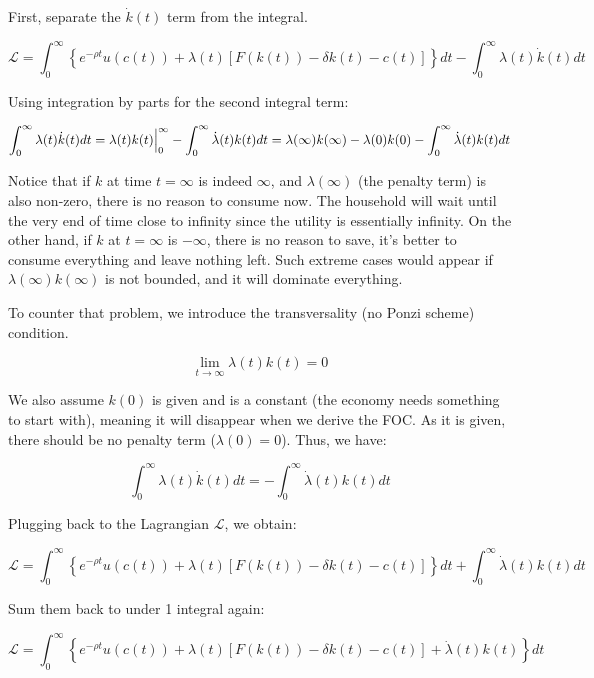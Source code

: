 \documentclass[11pt,a4paper]{book}
\theoremstyle{definition}\newtheorem{definition}{Definition}
\theoremstyle{definition}\newtheorem{fact}{Fact}
\theoremstyle{definition}\newtheorem{remark}{Remark}
\theoremstyle{definition}\newtheorem{ex}{Ex.}
\theoremstyle{definition}\newtheorem{project}{Project}
\theoremstyle{definition}\newtheorem{problem}{Problem}
\theoremstyle{definition}\newtheorem{example}{Example}
\numberwithin{theorem}{section}
\numberwithin{corollary}{chapter}
\numberwithin{assumption}{chapter}
\numberwithin{definition}{chapter}
\numberwithin{prop}{chapter}
\numberwithin{notation}{chapter}
\numberwithin{problem}{chapter}
\numberwithin{example}{chapter}
\numberwithin{fact}{chapter}
\numberwithin{ex}{chapter}
\begin{document}
First, separate the $\dot{k}(t)$ term from the integral.

$$
    \mathcal{L} = \int_{0}^{\infty} \left\{ e^{-\rho t} u(c(t)) + \lambda(t) \left[ F( k(t)) - \delta k(t) - c(t)  \right] \right\} dt - \int_{0}^{\infty} \lambda(t)\dot{k}(t)dt
$$

Using integration by parts  for the second integral term:

$$
     \int_{0}^{\infty} \lambda(t) \dot{k}(t) dt                                               \\
     = \lambda(t) k(t) \Big|_0^\infty - \int_{0}^{\infty} \dot{\lambda}(t)k(t)dt              \\
     = \lambda(\infty) k(\infty) - \lambda(0) k(0) - \int_{0}^{\infty} \dot{\lambda}(t)k(t)dt 
$$

Notice that if $k$ at time $t=\infty$ is indeed $\infty$, and $\lambda(\infty)$ (the penalty term) is also non-zero, there is no reason to consume now. The household will wait until the very end of time close to infinity since the utility is essentially infinity. On the other hand, if $k$ at $t=\infty$ is $-\infty$, there is no reason to save, it's better to consume everything and leave nothing left. Such extreme cases would appear if $\lambda(\infty)k(\infty)$ is not bounded, and it will dominate everything.

To counter that problem, we introduce the transversality (no Ponzi scheme) condition.

$$
    \lim_{t\to\infty} \lambda(t)k(t) = 0
$$

We also assume $k(0)$ is given and is a constant (the economy needs something to start with), meaning it will disappear when we derive the FOC. As it is given, there should be no penalty term ($\lambda(0) = 0$). Thus, we have:

$$
    \int_{0}^{\infty} \lambda(t)\dot{k}(t) dt = - \int_{0}^{\infty} \dot{\lambda}(t) k(t) dt
$$

Plugging back to the Lagrangian $\mathcal{L}$, we obtain:

$$
    \mathcal{L} = \int_{0}^{\infty} \left\{ e^{-\rho t} u(c(t)) + \lambda(t) \left[ F( k(t)) - \delta k(t) - c(t)  \right] \right\} dt + \int_{0}^{\infty} \dot{\lambda}(t)k(t)dt 
$$

Sum them back to under 1 integral again:

$$
    \mathcal{L} = \int_{0}^{\infty} \left\{ e^{-\rho t} u(c(t)) + \lambda(t) \left[ F( k(t)) - \delta k(t) - c(t)  \right] +  \dot{\lambda}(t)k(t) \right\} dt 
$$
\end{document}
